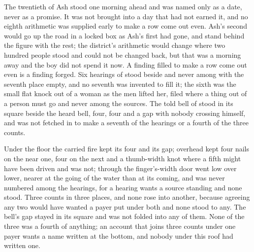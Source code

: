 The twentieth of Ash stood one morning ahead and was named only as a date, never as a promise. It was not brought into a day that had not earned it, and no eighth arithmetic was supplied early to make a row come out even. Ash's second would go up the road in a locked box as Ash's first had gone, and stand behind the figure with the rest; the district's arithmetic would change where two hundred people stood and could not be changed back, but that was a morning away and the boy did not spend it now. A finding filled to make a row come out even is a finding forged. Six hearings of  stood beside and never among with the seventh place empty, and no seventh was invented to fill it; the sixth was the small flat knock out of a woman as the men lifted her, filed where a thing out of a person must go and never among the sources. The told bell of  stood in its square beside the heard bell, four, four and a gap with nobody crossing himself, and was not fetched in to make a seventh of the hearings or a fourth of the three counts.

Under the floor the carried fire kept its four and its gap; overhead  kept four nails on the near one, four on the next and a thumb-width knot where a fifth might have been driven and was not; through the finger's-width door  went low over lower, nearer at the going of the water than at its coming, and was never numbered among the hearings, for a hearing wants a source standing and none stood. Three counts in three places, and none rose into another, because agreeing any two would have wanted a payer put under both and none stood to any. The bell's gap stayed in its square and was not folded into any of them. None of the three was a fourth of anything; an account that joins three counts under one payer wants a name written at the bottom, and nobody under this roof had written one.

\scenebreak

